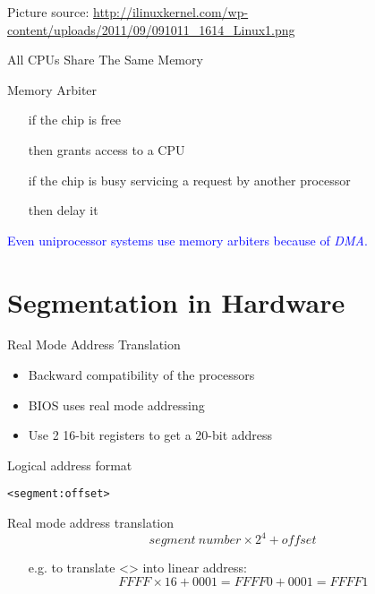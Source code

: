 Picture source: \url{http://ilinuxkernel.com/wp-content/uploads/2011/09/091011_1614_Linux1.png}

\begin{frame}{All CPUs Share The Same Memory}
  \begin{block}{Memory Arbiter}
    \begin{itemize}
    \item[if] the chip is free
    \item[then] grants access to a CPU
    \item[if] the chip is busy servicing a request by another processor
    \item[then] delay it
    \end{itemize}    
  \end{block}
  \textcolor{blue}{Even uniprocessor systems use memory arbiters because of \emph{DMA}.}
\end{frame}

\section{Segmentation in Hardware}
\label{sec:segm-hardw}

\begin{frame}{Real Mode Address Translation}
  \begin{itemize}
  \item Backward compatibility of the processors
  \item BIOS uses real mode addressing
  \item Use 2 16-bit registers to get a 20-bit address
  \end{itemize}

  \begin{block}{Logical address format}
    \begin{center}
      \texttt{<segment:offset>}
    \end{center}
  \end{block}

  \begin{block}{Real mode address translation}
    $$segment\ number\times{}2^4+offset$$
    \begin{itemize}
    \item[e.g.] to translate <> into linear address:
      $$FFFF \times{} 16 + 0001 = FFFF0 + 0001 = FFFF1$$
    \end{itemize}
  \end{block}
\end{frame}

